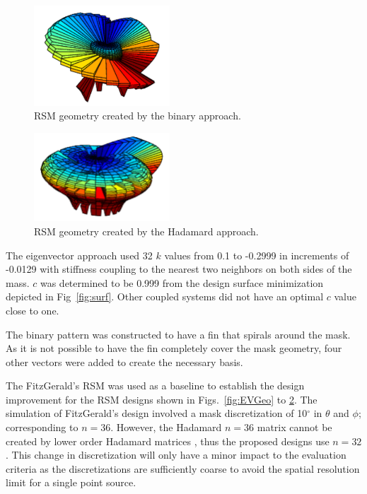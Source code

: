 \documentclass[3p,times]{elsarticle}
\begin{document}
\begin{figure}[ht!]
\includegraphics[width={2.0in}]{../figs/BiGeo.pdf}
\centering
\caption{RSM geometry created by the binary approach.}
\label{fig:BiGeo}

\end{figure}
\begin{figure}[ht!]
\centering
\includegraphics[width={2.0in}]{../figs/HadGeo.pdf}
\caption{RSM geometry created by the Hadamard approach.}
\label{fig:HadGeo}
\end{figure}

The eigenvector approach used 32 $k$ values from 0.1 to -0.2999 in increments of -0.0129 with stiffness coupling to the nearest two neighbors on both sides of the mass.
$c$ was determined to be 0.999 from the design surface minimization depicted in Fig~\ref{fig:surf}.  
Other coupled systems did not have an optimal $c$ value close to one.

The binary pattern was constructed to have a fin that spirals around the mask.  
As it is not possible to have the fin completely cover the mask geometry, four other vectors were added to create the necessary basis.

The FitzGerald's RSM was used as a baseline to establish the design improvement for the RSM designs shown in Figs.~\ref{fig:EVGeo} to \ref{fig:HadGeo}.  
The simulation of FitzGerald's design involved a mask discretization of 10$^\circ$ in $\theta$ and $\phi$; corresponding to $n=36$.  However, the Hadamard $n=36$ matrix cannot be created by lower order Hadamard matrices \cite{Weisstein}, thus the proposed designs use $n=32$. 
This change in discretization will only have a minor impact to the evaluation criteria as the discretizations are sufficiently coarse to avoid the spatial resolution limit for a single point source.
\end{document}
